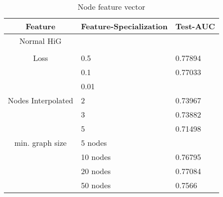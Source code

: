 \begin{table}
    \centering
    \caption{Node feature vector}
    \label{node_features}
    \begin{tabular}{c || l| p{6cm} |}
        Feature & Feature-Specialization& Test-AUC                                                 \\
        \hline
        \hline
        Normal HiG&   &        \\
	\hline                                               \\
        Loss & 0.5 & 0.77894 \\
             & 0.1 & 0.77033                                               \\
             & 0.01 &                                                \\
	\hline
        Nodes Interpolated & 2             & 0.73967                                                 \\
             & 3            & 0.73882                                                  \\
             & 5                 & 0.71498                              \\
	\hline
            min. graph size & 5 nodes                   &                                                   \\
             & 10 nodes                   & 0.76795    \\
             & 20 nodes                   & 0.77084    \\
             & 50 nodes                   & 0.7566                                                  \\
    \end{tabular}
\end{table}
